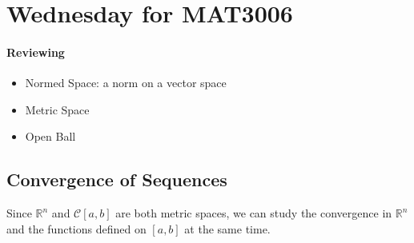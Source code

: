 \section{Wednesday for MAT3006}
\paragraph{Reviewing}
\begin{itemize}
\item
Normed Space: a norm on a vector space
\item
Metric Space
\item
Open Ball
\end{itemize}
\subsection{Convergence of Sequences}
Since $\mathbb{R}^n$ and $\mathcal{C}[a,b]$ are both metric spaces, we can study the convergence in $\mathbb{R}^n$ and the functions defined on $[a,b]$ at the same time.

